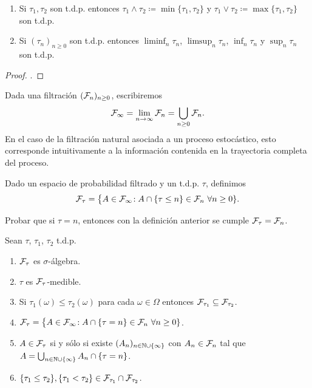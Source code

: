 \begin{prop}%
\leavevmode
\begin{enumerate}[label=\uptext{(\arabic*)}]
\item Si $\tau_1,\tau_2$ son t.d.p. entonces $\tau_1\wedge\tau_2\coloneqq\min\{\tau_1,\tau_2\}$ y $\tau_1\vee\tau_2\coloneqq\max\{\tau_1,\tau_2\}$ son t.d.p.
\item Si $(\tau_n)_{n\geq0}$ son t.d.p. entonces $\liminf_n\tau_n$, $\limsup_n\tau_n$, $\inf_n\tau_n$ y $\sup_n\tau_n$ son t.d.p.
\end{enumerate}
\end{prop}

\begin{proof}
\uexer.
\end{proof}

Dada una filtración $(\mathcal{F}_n)_{n\geq0}$, escribiremos
\[\mathcal{F}_\infty=\lim_{n\to\infty}\mathcal{F}_n=\bigcup_{n\geq0}\mathcal{F}_n.\]
En el caso de la filtración natural asociada a un proceso estocástico, esto corresponde intuitivamente a la información contenida en la trayectoria completa del proceso.

\begin{defn}
Dado un espacio de probabilidad filtrado y un t.d.p. $\tau$, definimos
\[\mathcal{F}_\tau=\big\{A\in\mathcal{F}_\infty\!:A\cap\{\tau\leq n\}\in\mathcal{F}_n~\forall n\geq0\}.\]
\end{defn}

\begin{ex}
Probar que si $\tau=n$, entonces con la definición anterior se cumple $\mathcal{F}_\tau=\mathcal{F}_n$.
\end{ex}

\begin{prop}
Sean $\tau$, $\tau_1$, $\tau_2$ t.d.p.
\begin{enumerate}[label=\uptext{(\arabic*)}]
\item $\mathcal{F}_\tau$ es $\sigma$-álgebra.
\item $\tau$ es $\mathcal{F}_\tau$-medible.
\item Si $\tau_1(\omega)\leq\tau_2(\omega)$ para cada $\omega\in\Omega$ entonces $\mathcal{F}_{\tau_1}\subseteq\mathcal{F}_{\tau_2}$.
\item $\mathcal{F}_\tau=\big\{A\in\mathcal{F}_\infty\!:A\cap\{\tau= n\}\in\mathcal{F}_n~\forall n\geq0\}$.
\item $A\in\mathcal{F}_\tau$ si y sólo si existe $(A_n)_{n\in\mathbb{N}\cup\{\infty\}}$ con $A_n\in\mathcal{F}_n$ tal que $A=\bigcup_{n\in\mathbb{N}\cup\{\infty\}}A_n\cap\{\tau=n\}$.
\item $\{\tau_1\leq\tau_2\},\{\tau_1<\tau_2\}\in\mathcal{F}_{\tau_1}\cap\mathcal{F}_{\tau_2}$.
\end{enumerate}
\end{prop}

